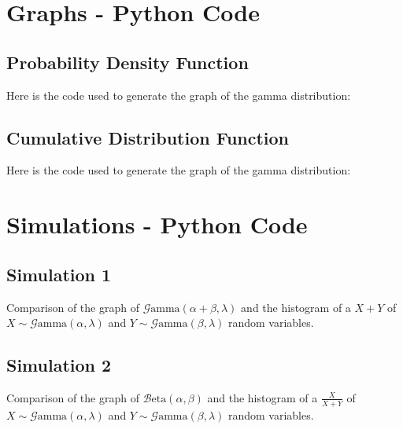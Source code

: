 \documentclass[12pt]{article}
\newcommand{\B}{\mathcal{B}}
\newcommand{\G}{\mathcal{G}}
\begin{document}
\begin{appendix}
\section{Graphs - Python Code \incomplete}
\subsection{Probability Density Function}
Here is the code used to generate the  graph of the gamma distribution:


\pagebreak
\subsection{Cumulative Distribution Function}
Here is the code used to generate the  graph of the gamma distribution:


\pagebreak
\section{Simulations - Python Code \incomplete}
\subsection{Simulation 1}
Comparison of the graph of $\G\text{amma}(\alpha+\beta, \lambda)$ and the histogram of a $X+Y$ of
$X\sim\G\text{amma}(\alpha, \lambda)$ and $Y\sim\G\text{amma}(\beta, \lambda)$ random variables.


\pagebreak
\subsection{Simulation 2}
Comparison of the graph of $\B\text{eta}(\alpha, \beta)$ and the histogram of a $\frac{X}{X+Y}$ of
$X\sim\G\text{amma}(\alpha, \lambda)$ and $Y\sim\G\text{amma}(\beta, \lambda)$ random variables.


\pagebreak
{}\listoffigures
\end{appendix}

\pagebreak{}\printbibliography[heading=bibintoc, title={References}]
\end{document}
